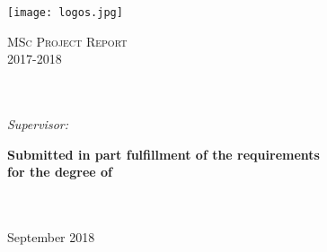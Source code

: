 \documentclass[
12pt, %
english, %
singlespacing, %
headsepline, %
table]{MastersDoctoralThesis} %
\author{Chaochen \textsc{Wang}} %
\begin{document}
\frontmatter %

\pagestyle{plain} %


\begin{titlepage}

\texttt{[image: logos.jpg]} %
\begin{center}



\vspace*{.06\textheight}
{\scshape\LARGE \bfseries \univname\par}\vspace{1.5cm} %
\textsc{\Large MSc Project Report \\ 2017-2018}\\[0.5cm] %

\HRule \\[0.4cm] %
{\Huge \bfseries \ttitle\par}\vspace{0.3cm} %
\HRule \\[1cm] %

\emph{Supervisor:} \\
\href{https://www.lshtm.ac.uk/aboutus/people/palla.luigi}{\supname} %

\vfill

\large \textbf{Submitted in part fulfillment of the requirements\\ for the degree of \degreename}\\[0.3cm] %
\groupname\\\deptname\\[1.8cm] %

\vfill

{\large September 2018}\\[4cm] %

\vfill
\end{center}
\end{titlepage}
\end{document}
